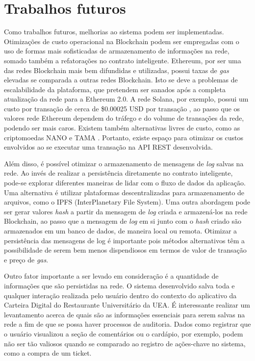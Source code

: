 \section{Trabalhos futuros}
Como trabalhos futuros, melhorias ao sistema podem ser implementadas. Otimizações de custo operacional na Blockchain podem ser empregadas com o uso de formas mais sofisticadas de armazenamento de informações na rede, somado também a refatorações no contrato inteligente. Ethereum, por ser uma das redes Blockchain mais bem difundidas e utilizadas, possui taxas de \emph{gas} elevadas se comparada a outras redes Blockchain. Isto se deve a problemas de escalabilidade da plataforma, que pretendem ser sanados após a completa atualização da rede para a Ethereum 2.0. A rede Solana, por exemplo, possui um custo por transação de cerca de \$0.00025 USD por transação \cite{solana_compass}, ao passo que os valores rede Ethereum dependem do tráfego e do volume de transações da rede, podendo ser mais caros. Existem também alternativas livres de custo, como as criptomoedas NANO e TAMA \cite{analytics_insight}. Portanto, existe espaço para otimizar os custos envolvidos ao se executar uma transação na API REST desenvolvida.

Além disso, é possível otimizar o armazenamento de mensagens de \emph{log} salvas na rede. Ao invés de realizar a persistência diretamente no contrato inteligente, pode-se explorar diferentes maneiras de lidar com o fluxo de dados da aplicação. Uma alternativa é utilizar plataformas descentralizadas para armazenamento de arquivos, como o IPFS (InterPlanetary File System). Uma outra abordagem pode ser gerar valores \emph{hash} a partir da mensagem de \emph{log} criada e armazená-los na rede Blockchain, ao passo que a mensagem de \emph{log} em si junto com o \emph{hash} criado são armazenados em um banco de dados, de maneira local ou remota. Otimizar a persistência das mensagens de log é importante pois métodos alternativos têm a possibilidade de serem bem menos dispendiosos em termos de valor de transação e preço de \emph{gas}.

Outro fator importante a ser levado em consideração é a quantidade de informações que são persistidas na rede. O sistema desenvolvido salva toda e qualquer interação realizada pelo usuário dentro do contexto do aplicativo da Carteira Digital do Restaurante Universitário da UEA. É interessante realizar um levantamento acerca de quais são as informações essenciais para serem salvas na rede a fim de que se possa haver processos de auditoria. Dados como registrar que o usuário visualizou a seção de comentários ou o cardápio, por exemplo, podem não ser tão valiosos quando se comparado ao registro de ações-chave no sistema, como a compra de um ticket.